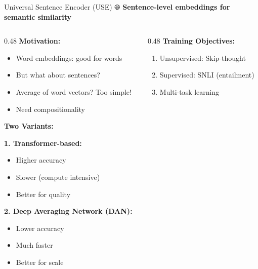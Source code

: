 \documentclass[aspectratio=169]{beamer}
\begin{document}
\begin{frame}[shrink=10]{Universal Sentence Encoder (USE) 🌐}
\textbf{Sentence-level embeddings for semantic similarity}

\vspace{1em}

\begin{columns}[T]
\begin{column}{0.48\textwidth}
\textbf{Motivation:}
\begin{itemize}\setlength{\itemsep}{0pt}
    \item Word embeddings: good for words
    \item But what about sentences?
    \item Average of word vectors? Too simple!
    \item Need compositionality
\end{itemize}

\vspace{0.5em}
\textbf{Two Variants:}

\vspace{0.3em}
\textbf{1. Transformer-based:}
\begin{itemize}\setlength{\itemsep}{0pt}
    \item Higher accuracy
    \item Slower (compute intensive)
    \item Better for quality
\end{itemize}

\vspace{0.3em}
\textbf{2. Deep Averaging Network (DAN):}
\begin{itemize}\setlength{\itemsep}{0pt}
    \item Lower accuracy
    \item Much faster
    \item Better for scale
\end{itemize}
\end{column}

\begin{column}{0.48\textwidth}
\textbf{Training Objectives:}
\begin{enumerate}\setlength{\itemsep}{0pt}
    \item Unsupervised: Skip-thought
    \item Supervised: SNLI (entailment)
    \item Multi-task learning
\end{enumerate}


\end{column}
\end{columns}
\end{frame}
\end{document}
